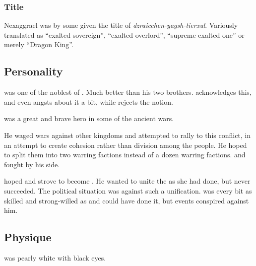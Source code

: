 \subsubsection{Title}
Nexaggrael was by some given the  title of \emph{dzraicchen-yagsh-tierxul}. Variously translated as “exalted sovereign”, “exalted overlord”, “supreme exalted one” or merely “Dragon King”. 









\subsection{Personality}
\Nexagglachel{} was one of the noblest of \dragons. Much better than his two brothers. \Ishnaruchaefir{} acknowledges this, and even angsts about it a bit, while \Secherdamon{} rejects the notion. 

\Nexagglachel{} was a great and brave hero in some of the ancient wars. 

He waged wars against other \draconian{} kingdoms and attempted to rally \dragons{} to this conflict, in an attempt to create cohesion rather than division among the \draconian{} people. He hoped to split them into two warring factions instead of a dozen warring factions. \Ishnaruchaefir{} and \Secherdamon{} fought by his side. 

\Nexagglachel{} hoped and strove to become . 
He wanted to unite the \dzraicchenosses{} as she had done, but never succeeded. 
The political situation was against such a unification. 
\Nexagglachel{} was every bit as skilled and strong-willed as \Kserasshana{} and could have done it, but events conspired against him. 









\subsection{Physique}
\Nexagglachel was pearly white with black eyes. 









